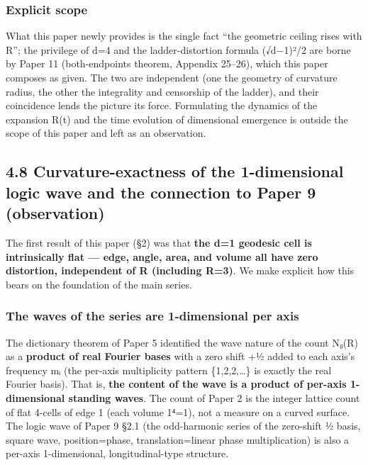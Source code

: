 \documentclass[
]{ltjsarticle}
\begin{document}
\subsubsection{Explicit scope}\label{explicit-scope}

What this paper newly provides is the single fact ``the geometric
ceiling rises with R''; the privilege of d=4 and the ladder-distortion
formula (√d−1)²/2 are borne by Paper 11 (both-endpoints theorem,
Appendix 25--26), which this paper composes as given. The two are
independent (one the geometry of curvature radius, the other the
integrality and censorship of the ladder), and their coincidence lends
the picture its force. Formulating the dynamics of the expansion R(t)
and the time evolution of dimensional emergence is outside the scope of
this paper and left as an observation.

\subsection{4.8 Curvature-exactness of the 1-dimensional logic wave and
the connection to Paper 9
(observation)}\label{curvature-exactness-of-the-1-dimensional-logic-wave-and-the-connection-to-paper-9-observation}

The first result of this paper (§2) was that \textbf{the d=1 geodesic
cell is intrinsically flat --- edge, angle, area, and volume all have
zero distortion, independent of R (including R=3)}. We make explicit how
this bears on the foundation of the main series.

\subsubsection{The waves of the series are 1-dimensional per
axis}\label{the-waves-of-the-series-are-1-dimensional-per-axis}

The dictionary theorem of Paper 5 identified the wave nature of the
count N₀(R) as a \textbf{product of real Fourier bases} with a zero
shift +½ added to each axis's frequency mᵢ (the per-axis multiplicity
pattern \{1,2,2,\ldots\} is exactly the real Fourier basis). That is,
\textbf{the content of the wave is a product of per-axis 1-dimensional
standing waves}. The count of Paper 2 is the integer lattice count of
flat 4-cells of edge 1 (each volume 1⁴=1), not a measure on a curved
surface. The logic wave of Paper 9 §2.1 (the odd-harmonic series of the
zero-shift ½ basis, square wave, position=phase, translation=linear
phase multiplication) is also a per-axis 1-dimensional,
longitudinal-type structure.
\end{document}
